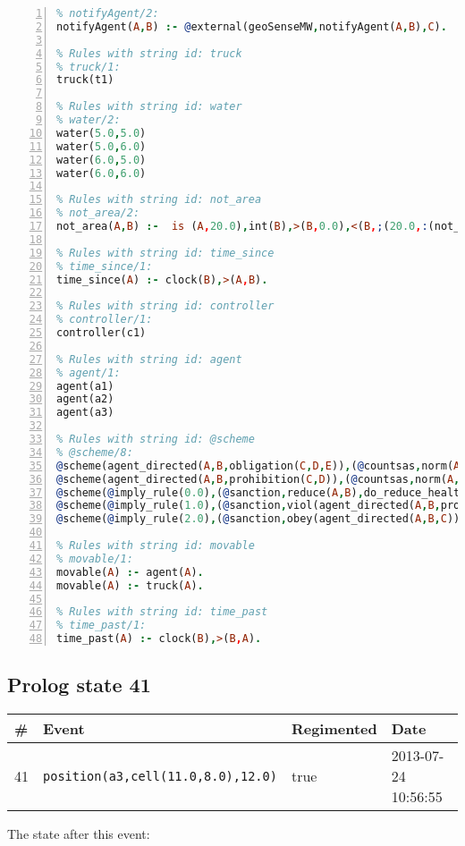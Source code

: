 \documentclass[11pt]{article}\usepackage[utf8]{inputenc}\usepackage{geometry}
\begin{document}
\begin{lstlisting}[language=Prolog, numbers=left]
% Rules with string id: notifyAgent
% notifyAgent/2:
notifyAgent(A,B) :- @external(geoSenseMW,notifyAgent(A,B),C).

% Rules with string id: truck
% truck/1:
truck(t1)

% Rules with string id: water
% water/2:
water(5.0,5.0)
water(5.0,6.0)
water(6.0,5.0)
water(6.0,6.0)

% Rules with string id: not_area
% not_area/2:
not_area(A,B) :-  is (A,20.0),int(B),>(B,0.0),<(B,;(20.0,:(not_area(A,B), is (-(B),20.0)))),int(A),>(A,0.0),<(A,;(20.0,:(area(A,B),-(int(A))))),int(B),>(A,0.0),>(B,0.0),<(A,21.0),<(B,21.0).

% Rules with string id: time_since
% time_since/1:
time_since(A) :- clock(B),>(A,B).

% Rules with string id: controller
% controller/1:
controller(c1)

% Rules with string id: agent
% agent/1:
agent(a1)
agent(a2)
agent(a3)

% Rules with string id: @scheme
% @scheme/8:
@scheme(agent_directed(A,B,obligation(C,D,E)),(@countsas,norm(A,B,F,obligation(C,D,E)),F),false,(listTrue(C)),(time_past(D)),false,[plus(viol(agent_directed(A,B,obligation(C,D,E))))|[]],[plus(obey(agent_directed(A,B,obligation(C,D,E))))|[]])
@scheme(agent_directed(A,B,prohibition(C,D)),(@countsas,norm(A,B,E,prohibition(C,D)),E),(listTrue(C)),false,(false),false,[plus(viol(agent_directed(A,B,prohibition(C,D))))|[]],[plus(obey(agent_directed(A,B,prohibition(C,D))))|[]])
@scheme(@imply_rule(0.0),(@sanction,reduce(A,B),do_reduce_health(A,B),notifyAgent(A,changed(status))),true,false,false,false,[min(reduce(A,B))|[]],[])
@scheme(@imply_rule(1.0),(@sanction,viol(agent_directed(A,B,prohibition(C,D))),do_sanction(D)),true,false,false,false,[min(viol(agent_directed(A,B,prohibition(C,D))))|[]],[])
@scheme(@imply_rule(2.0),(@sanction,obey(agent_directed(A,B,C))),true,false,false,false,[min(obey(agent_directed(A,B,C)))|[]],[])

% Rules with string id: movable
% movable/1:
movable(A) :- agent(A).
movable(A) :- truck(A).

% Rules with string id: time_past
% time_past/1:
time_past(A) :- clock(B),>(B,A).

\end{lstlisting}
\clearpage 
\subsection{Prolog state 41}
\begin{table}[ht]
\centering 
\begin{tabular}{l l l l} 
\textbf{\#} & \textbf{Event} & \textbf{Regimented} & \textbf{Date} \\ [0.5ex] 
\hline
41&\texttt{position(a3,cell(11.0,8.0),12.0)}&true&2013-07-24 10:56:55\\ [1ex] \hline\end{tabular}
\end{table}
The state after this event:
\end{document}
